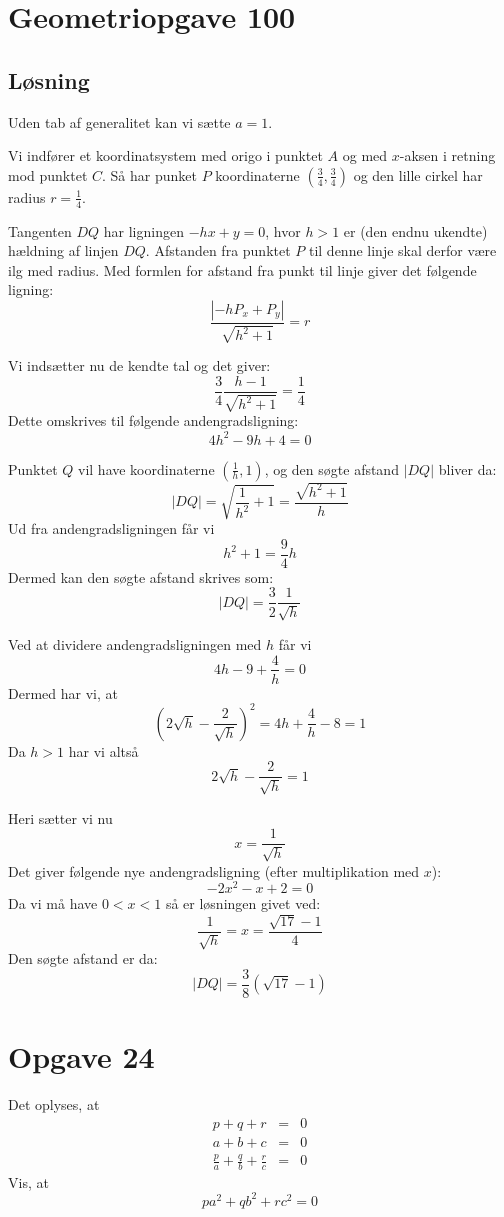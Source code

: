 \documentclass[12pt,oneside,a4paper]{article}
\newcommand{\bas}{\begin{eqnarray*}}
\newcommand{\eas}{\end{eqnarray*}}
\begin{document}
\section{Geometriopgave 100}

\subsection{Løsning}
Uden tab af generalitet kan vi sætte $a=1$.

Vi indfører et koordinatsystem med origo i punktet $A$ og med $x$-aksen i retning mod punktet $C$. Så har punket $P$ koordinaterne $(\frac 34, \frac 34)$ og den lille cirkel har radius $r=\frac 14$.

Tangenten $DQ$ har ligningen $-hx+y=0$, hvor $h>1$ er (den endnu ukendte) hældning af linjen $DQ$. Afstanden fra punktet $P$ til denne linje skal derfor være ilg med radius. Med formlen for afstand fra punkt til linje giver det følgende ligning:
$$
\frac{\left|-hP_x+P_y\right|}{\sqrt{h^2+1}} = r
$$

Vi indsætter nu de kendte tal og det giver:
$$
\frac 34 \frac{h-1}{\sqrt{h^2+1}} = \frac 14
$$
Dette omskrives til følgende andengradsligning:
$$
4h^2-9h+4=0
$$

Punktet $Q$ vil have koordinaterne $(\frac 1h, 1)$, og den søgte afstand $|DQ|$ bliver da:
$$
|DQ| = \sqrt{\frac{1}{h^2} + 1} = \frac{\sqrt{h^2+1}}{h}
$$
Ud fra andengradsligningen får vi
$$
h^2+1 = \frac 94 h
$$
Dermed kan den søgte afstand skrives som:
$$
|DQ| = \frac{3}{2} \frac{1}{\sqrt h}
$$

Ved at dividere andengradsligningen med $h$ får vi
$$
4h-9+\frac 4h=0
$$
Dermed har vi, at 
$$
\left(2\sqrt h - \frac{2}{\sqrt h}\right)^2 = 4h + \frac 4h - 8 = 1
$$
Da $h>1$ har vi altså
$$
2\sqrt h - \frac{2}{\sqrt h} = 1
$$

Heri sætter vi nu
$$
x= \frac{1}{\sqrt h}
$$
Det giver følgende nye andengradsligning (efter multiplikation med $x$):
$$
-2x^2-x+2=0
$$
Da vi må have $0<x<1$ så er løsningen givet ved:
$$
\frac{1}{\sqrt h} = x=\frac{\sqrt{17}-1}{4}
$$
Den søgte afstand er da:
$$
|DQ| = \frac{3}{8} \left(\sqrt{17}-1\right)
$$



\section{Opgave 24}
Det oplyses, at
\bas
p+q+r &=& 0 \\
a+b+c &=& 0 \\
\frac{p}{a} + \frac{q}{b} + \frac{r}{c} &=& 0
\eas
Vis, at
$$
pa^2+qb^2+rc^2=0
$$
\end{document}

